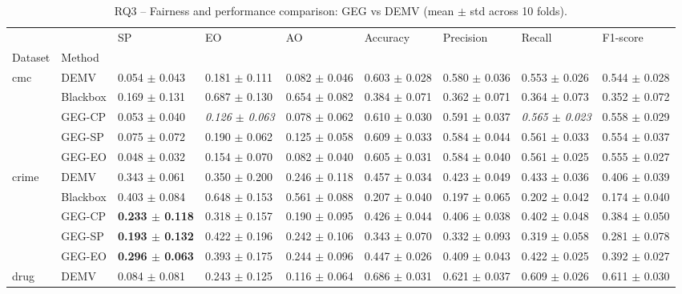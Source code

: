 \begin{table}
\caption{RQ3 -- Fairness and performance comparison: GEG vs DEMV (mean $\pm$ std across 10 folds).}
\label{tab:rq3_results}
\begin{tabular}{lllllllll}
\toprule
 &  & SP & EO & AO & Accuracy & Precision & Recall & F1-score \\
Dataset & Method &  &  &  &  &  &  &  \\
\midrule
\multirow[t]{5}{*}{cmc} & DEMV & 0.054 $\pm$ 0.043 & 0.181 $\pm$ 0.111 & 0.082 $\pm$ 0.046 & 0.603 $\pm$ 0.028 & 0.580 $\pm$ 0.036 & 0.553 $\pm$ 0.026 & 0.544 $\pm$ 0.028 \\
 & Blackbox & 0.169 $\pm$ 0.131 & 0.687 $\pm$ 0.130 & 0.654 $\pm$ 0.082 & 0.384 $\pm$ 0.071 & 0.362 $\pm$ 0.071 & 0.364 $\pm$ 0.073 & 0.352 $\pm$ 0.072 \\
 & GEG-CP & 0.053 $\pm$ 0.040 & \textit{0.126 $\pm$ 0.063} & 0.078 $\pm$ 0.062 & 0.610 $\pm$ 0.030 & 0.591 $\pm$ 0.037 & \textit{0.565 $\pm$ 0.023} & 0.558 $\pm$ 0.029 \\
 & GEG-SP & 0.075 $\pm$ 0.072 & 0.190 $\pm$ 0.062 & 0.125 $\pm$ 0.058 & 0.609 $\pm$ 0.033 & 0.584 $\pm$ 0.044 & 0.561 $\pm$ 0.033 & 0.554 $\pm$ 0.037 \\
 & GEG-EO & 0.048 $\pm$ 0.032 & 0.154 $\pm$ 0.070 & 0.082 $\pm$ 0.040 & 0.605 $\pm$ 0.031 & 0.584 $\pm$ 0.040 & 0.561 $\pm$ 0.025 & 0.555 $\pm$ 0.027 \\
\cline{1-9}
\multirow[t]{5}{*}{crime} & DEMV & 0.343 $\pm$ 0.061 & 0.350 $\pm$ 0.200 & 0.246 $\pm$ 0.118 & 0.457 $\pm$ 0.034 & 0.423 $\pm$ 0.049 & 0.433 $\pm$ 0.036 & 0.406 $\pm$ 0.039 \\
 & Blackbox & 0.403 $\pm$ 0.084 & 0.648 $\pm$ 0.153 & 0.561 $\pm$ 0.088 & 0.207 $\pm$ 0.040 & 0.197 $\pm$ 0.065 & 0.202 $\pm$ 0.042 & 0.174 $\pm$ 0.040 \\
 & GEG-CP & \textbf{0.233 $\pm$ 0.118} & 0.318 $\pm$ 0.157 & 0.190 $\pm$ 0.095 & 0.426 $\pm$ 0.044 & 0.406 $\pm$ 0.038 & 0.402 $\pm$ 0.048 & 0.384 $\pm$ 0.050 \\
 & GEG-SP & \textbf{0.193 $\pm$ 0.132} & 0.422 $\pm$ 0.196 & 0.242 $\pm$ 0.106 & 0.343 $\pm$ 0.070 & 0.332 $\pm$ 0.093 & 0.319 $\pm$ 0.058 & 0.281 $\pm$ 0.078 \\
 & GEG-EO & \textbf{0.296 $\pm$ 0.063} & 0.393 $\pm$ 0.175 & 0.244 $\pm$ 0.096 & 0.447 $\pm$ 0.026 & 0.409 $\pm$ 0.043 & 0.422 $\pm$ 0.025 & 0.392 $\pm$ 0.027 \\
\cline{1-9}
\multirow[t]{5}{*}{drug} & DEMV & 0.084 $\pm$ 0.081 & 0.243 $\pm$ 0.125 & 0.116 $\pm$ 0.064 & 0.686 $\pm$ 0.031 & 0.621 $\pm$ 0.037 & 0.609 $\pm$ 0.026 & 0.611 $\pm$ 0.030 \\

\end{tabular}
\end{table}
